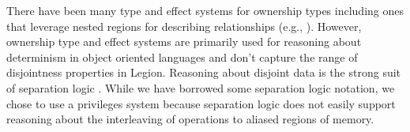
There have been many type and effect systems for ownership types
\cite{Boyapati03} including ones that leverage nested regions for describing
relationships (e.g., \cite{Clarke02}).  However, ownership type and effect systems
are primarily used for reasoning about determinism in object oriented languages and
don't capture the range of disjointness properties in Legion.
Reasoning about disjoint data is the strong suit of separation logic \cite{Reynolds02}.  
While we have borrowed some separation logic notation, we chose to use a 
privileges system because separation logic does not easily
support reasoning about the interleaving of operations to aliased regions of memory.





